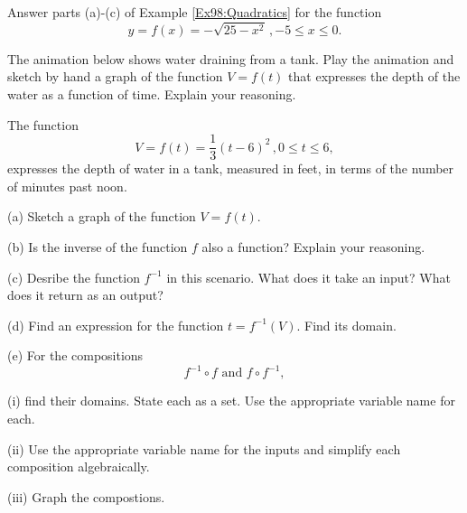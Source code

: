 \documentclass{ximera}
\begin{document}
\begin{example}  \label{Ex96:Quadratics}
Answer parts (a)-(c) of Example \ref{Ex98:Quadratics} for the function
\[
    y=   f(x) = - \sqrt{25-x^2} \, , -5 \leq x \leq 0 .
\]

\end{example}



\begin{exploration} \label{E1:Quadratics}
The animation below shows water draining from a tank. Play the animation and sketch by hand a graph of the function $V=f(t)$ that expresses the depth of the water as a function of time. Explain your reasoning.


 
\begin{onlineOnly}
    \begin{center}
\end{center}
\end{onlineOnly}
\end{exploration}


\begin{example} \label{Ex1:Quadratics}
The function 
\[
     V = f(t) = \frac{1}{3}(t-6)^2 \, , 0\leq t \leq 6 ,
\]
expresses the depth of water in a tank, measured in feet, in terms of the number of minutes past noon. 

(a) Sketch a graph of the function $V=f(t)$.

(b) Is the inverse of the function $f$ also a function? Explain your reasoning.

(c) Desribe the function $f^{-1}$ in this scenario. What does it take an input? What does it return as an output?

(d) Find an expression for the function $t = f^{-1}(V)$. Find its domain.

(e) For the compositions
\[
    f^{-1}\circ f \text{  and  } f\circ f^{-1} ,
\]

(i) find their domains. State each as a set. Use the appropriate variable name for each.

(ii) Use the appropriate variable name for the inputs and simplify each composition algebraically.

(iii) Graph the compostions.


\end{example}
\end{document}
